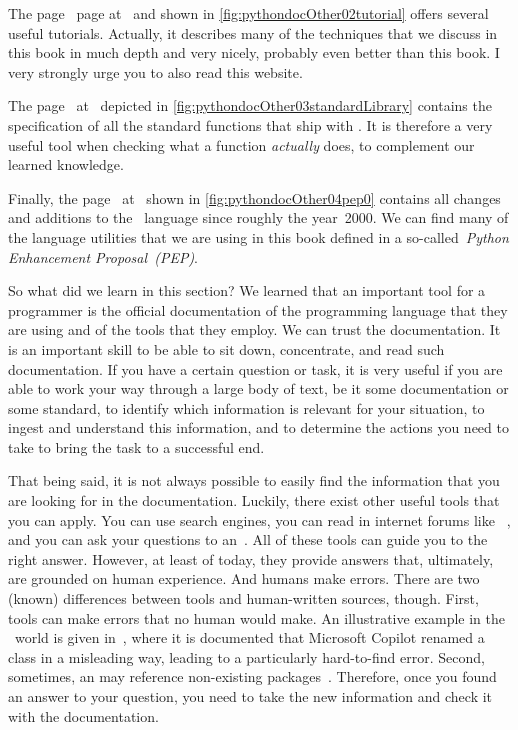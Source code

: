 \begin{noglslink}
The  page~\cite{PSF:P3D:TPT} page at~ and shown in \cref{fig:pythondocOther02tutorial} offers several useful tutorials.
Actually, it describes many of the techniques that we discuss in this book in much depth and very nicely, probably even better than this book.
I very strongly urge you to also read this website.

The  page~\cite{PSF:P3D:TPSL} at~ depicted in \cref{fig:pythondocOther03standardLibrary} contains the specification of all the standard functions that ship with \python.
It is therefore a very useful tool when checking what a function \emph{actually} does, to complement our learned knowledge.

Finally, the  page~\cite{PEP0} at~ shown in \cref{fig:pythondocOther04pep0} contains all changes and additions to the \python\ language since roughly the year~2000.
We can find many of the language utilities that we are using in this book defined in a so-called~\emph{Python Enhancement Proposal~(PEP)}.

So what did we learn in this section?
We learned that an important tool for a programmer is the official documentation of the programming language that they are using and of the tools that they employ.
We can trust the documentation.
It is an important skill to be able to sit down, concentrate, and read such documentation.
If you have a certain question or task, it is very useful if you are able to work your way through a large body of text, be it some documentation or some standard, to identify which information is relevant for your situation, to ingest and understand this information, and to determine the actions you need to take to bring the task to a successful end.

That being said, it is not always possible to easily find the information that you are looking for in the documentation.
Luckily, there exist other useful tools that you can apply.
You can use search engines, you can read in internet forums like ~\cite{SE:SO}, and you can ask your questions to an~.
All of these tools can guide you to the right answer.
However, at least of today, they provide answers that, ultimately, are grounded on human experience.
And humans make errors.
There are two (known) differences between  tools and human-written sources, though.
First,  tools can make errors that no human would make.
An illustrative example in the \python\ world is given in~\cite{BSHETB:VSK2025CIC}, where it is documented that Microsoft Copilot renamed a class in a misleading way, leading to a particularly hard-to-find error.
Second, sometimes, an  may reference non-existing packages~\cite{AT:G2025AGCCBADFTSSCHW}.
Therefore, once you found an answer to your question, you need to take the new information and check it with the documentation.


\end{noglslink}
